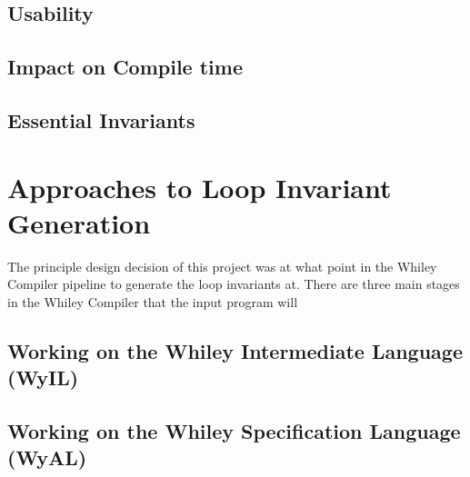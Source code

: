 \subsection{Usability}

\subsection{Impact on Compile time}

\subsection{Essential Invariants}


\section{Approaches to Loop Invariant Generation}

The principle design decision of this project was at what point in the Whiley Compiler pipeline
to generate the loop invariants at.
There are three main stages in the Whiley Compiler that the input program will 

\subsection{Working on the Whiley Intermediate Language (WyIL)}

\cite{wyil}

\subsection{Working on the Whiley Specification Language (WyAL)}

